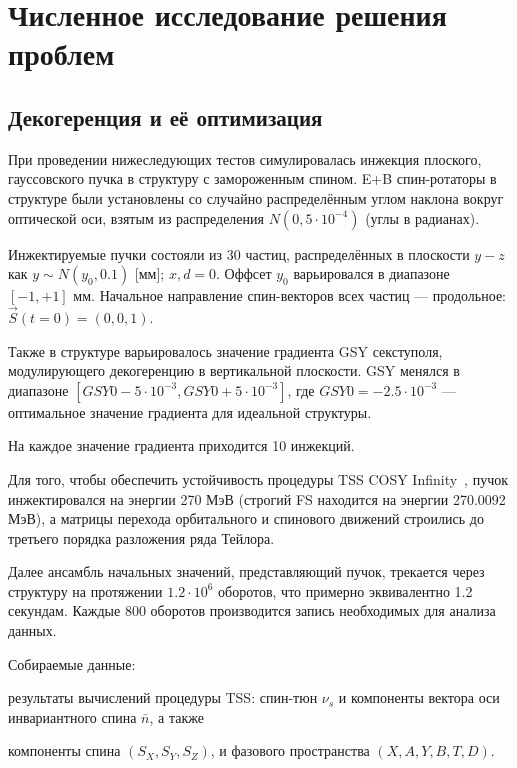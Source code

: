 \chapter{Численное исследование решения проблем} \label{chpt:simulation}



\section{Декогеренция и её оптимизация}\label{sec:decoherence_simulations}
При проведении нижеследующих тестов симулировалась инжекция
плоского, гауссовского пучка в структуру с замороженным
спином. E+B спин-ротаторы в структуре были установлены со случайно распределённым углом наклона вокруг оптической оси, взятым из распределения $N(0, 5\cdot10^{-4})$ (углы в радианах).

Инжектируемые пучки состояли из 30 частиц, распределённых в
плоскости $y-z$ как $y\sim N(y_0, 0.1)$ [мм]; $x,d =
0$. Оффсет $y_0$ варьировался в диапазоне $[-1, +1]$ мм. Начальное
направление спин-векторов всех частиц --- продольное: $\vec S(t=0) = (0,0,1)$.

Также в структуре варьировалось значение градиента GSY секступоля,
модулирующего декогеренцию в вертикальной плоскости. GSY менялся в
диапазоне $[GSY0 - 5\cdot10^{-3}, GSY0 + 5\cdot10^{-3}]$, где
$GSY0=-2.5\cdot 10^{-3}$ --- оптимальное значение градиента для идеальной структуры.

На каждое значение градиента приходится 10 инжекций.

Для того, чтобы обеспечить устойчивость процедуры TSS COSY Infinity~\cite{COSYINF:BeamPhysMan}, пучок инжектировался на энергии 270 МэВ (строгий FS находится на энергии 270.0092 МэВ), а матрицы перехода орбитального и спинового движений строились до третьего порядка разложения ряда Тейлора. 

Далее ансамбль начальных значений, представляющий пучок, трекается
через структуру на протяжении $1.2\cdot10^6$ оборотов, что
примерно эквивалентно 1.2 секундам. Каждые 800 оборотов производится
запись необходимых для анализа данных.

Собираемые данные: 
\begin{enumerate*}
	\item результаты вычислений процедуры TSS: спин-тюн $\nu_s$ и компоненты вектора оси инвариантного спина $\bar n$, а также
	\item компоненты спина $(S_X, S_Y, S_Z)$, и фазового пространства $(X,A,Y,B,T,D)$.
\end{enumerate*}

